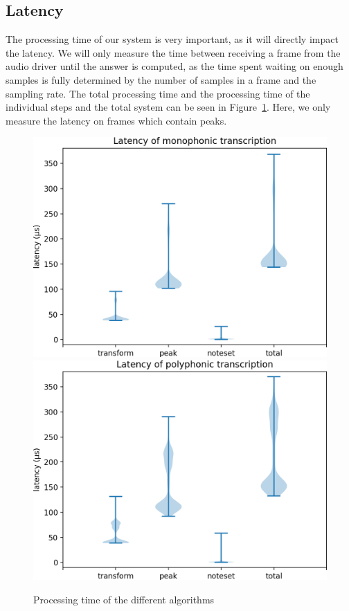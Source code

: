 \documentclass[10pt,twocolumn]{article}
\begin{document}
\subsection{Latency}  \label{sub:algspeed}
The processing time of our system is very important, as it will directly impact the latency. We will only measure the time between receiving a frame from the audio driver until the answer is computed, as the time spent waiting on enough samples is fully determined by the number of samples in a frame and the sampling rate. The total processing time and the processing time of the individual steps and the total system can be seen in Figure~\ref{fig:snel}. Here, we only measure the latency on frames which contain peaks.
\begin{figure}[t]%
    \centering
    \includegraphics[width=\linewidth]{1.png}\vspace{+6mm} %
    \includegraphics[width=\linewidth]{2.png} %
    \caption{Processing time of the different algorithms}
    \label{fig:snel}
\end{figure}%
\end{document}
